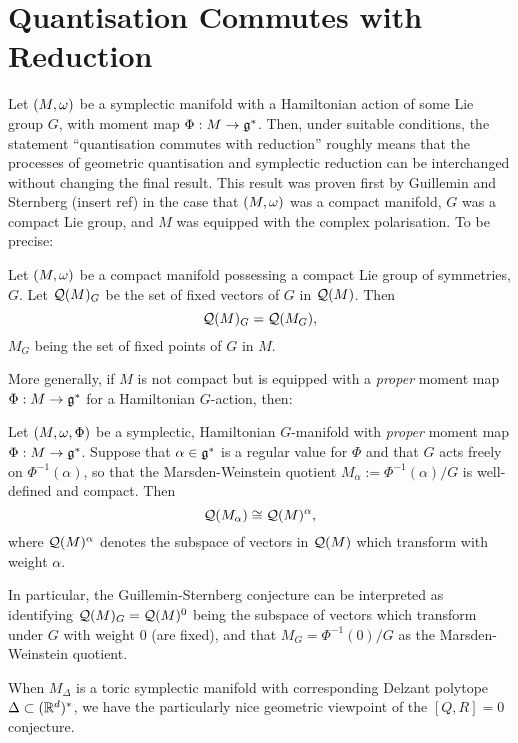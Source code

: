 \section{Quantisation Commutes with Reduction}

Let $(M,\omega)$ be a symplectic manifold with a Hamiltonian action of some Lie group $G$, with moment map $\Phi:M \rightarrow \mathfrak{g}^{\ast}$. Then, under suitable conditions, the statement ``quantisation commutes with reduction'' roughly means that the processes of geometric quantisation and symplectic reduction can be interchanged without changing the final result. This result was proven first by Guillemin and Sternberg (insert ref) in the case that $(M,\omega)$ was a compact \K manifold, $G$ was a compact Lie group, and $M$ was equipped with the complex polarisation. To be precise:
\begin{thm}[G-S]
	Let $(M,\omega)$ be a compact \K manifold possessing a compact Lie group of symmetries, $G$. Let $\mathcal{Q}(M)_{G}$ be the set of fixed vectors of $G$ in $\mathcal{Q}(M)$. Then
	\begin{equation*}
		\mathcal{Q}(M)_{G} = \mathcal{Q}(M_{G}),
	\end{equation*}
	$M_{G}$ being the set of fixed points of $G$ in $M$.
\end{thm}

More generally, if $M$ is not compact but is equipped with a \emph{proper} moment map $\Phi: M \rightarrow \mathfrak{g}^{\ast}$ for a Hamiltonian $G$-action, then:
\begin{thm}
	Let $(M,\omega,\Phi)$ be a symplectic, Hamiltonian $G$-manifold with \emph{proper} moment map $\Phi:M \rightarrow \mathfrak{g}^{\ast}$. Suppose that $\alpha \in \mathfrak{g}^{\ast}$ is a regular value for $\Phi$ and that $G$ acts freely on $\Phi^{-1}(\alpha)$, so that the Marsden-Weinstein quotient $M_{\alpha} := \Phi^{-1}(\alpha)/G$ is well-defined and compact. Then
	\begin{equation*}
		\mathcal{Q}(M_{\alpha}) \cong \mathcal{Q}(M)^{\alpha},
	\end{equation*}
	where $\mathcal{Q}(M)^{\alpha}$ denotes the subspace of vectors in $\mathcal{Q}(M)$ which transform with weight $\alpha$.
\end{thm}

In particular, the Guillemin-Sternberg conjecture can be interpreted as identifying $\mathcal{Q}(M)_{G} = \mathcal{Q}(M)^{0}$ being the subspace of vectors which transform under $G$ with weight $0$ (\ie are fixed), and that $M_{G} = \Phi^{-1}(0)/G$ as the Marsden-Weinstein quotient.

When $M_{\Delta}$ is a toric symplectic manifold with corresponding Delzant polytope $\Delta \subset (\mathbb{R}^{d})^{\ast}$, we have the particularly nice geometric viewpoint of the $[Q,R] = 0$ conjecture.

